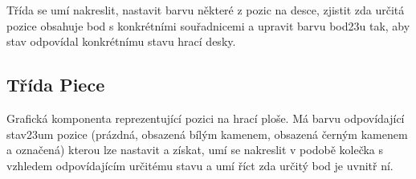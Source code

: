 \documentclass{article}
\begin{document}
T\v{r}\'ida se um\'i nakreslit, nastavit barvu n\v{e}kter\'e z pozic na desce, zjistit zda ur\v{c}it\'a pozice obsahuje bod s konkr\'etn\'imi sou\v{r}adnicemi a upravit barvu bod\accent23u tak, aby stav odpov\'idal konkr\'etn\'imu stavu hrac\'i desky.



\subsection{T\v{r}\'ida Piece}
Grafick\'a komponenta reprezentuj\'ic\'i pozici na hrac\'i plo\v{s}e. M\'a barvu odpov\'idaj\'ic\'i stav\accent23um pozice (pr\'azdn\'a, obsazen\'a b\'il\'ym kamenem, obsazen\'a \v{c}ern\'ym kamenem a ozna\v{c}en\'a) kterou lze nastavit a z\'iskat, um\'i se nakreslit v podob\v{e} kole\v{c}ka s vzhledem odpov\'idaj\'ic\'im ur\v{c}it\'emu stavu a um\'i \v{r}\'ict zda ur\v{c}it\'y bod je uvnit\v{r} n\'i.
\end{document}

